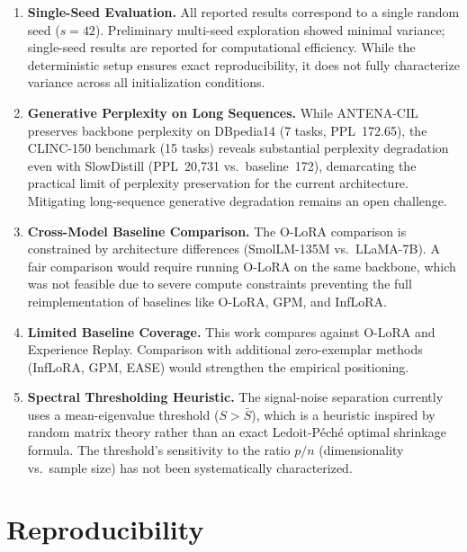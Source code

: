 \documentclass[11pt,a4paper]{article}
\begin{document}
\begin{enumerate}
    \item \textbf{Single-Seed Evaluation.} All reported results correspond to a single random seed ($s=42$). Preliminary multi-seed exploration showed minimal variance; single-seed results are reported for computational efficiency. While the deterministic setup ensures exact reproducibility, it does not fully characterize variance across all initialization conditions.
    \item \textbf{Generative Perplexity on Long Sequences.} While ANTENA-CIL preserves backbone perplexity on DBpedia14 (7 tasks, PPL~172.65), the CLINC-150 benchmark (15 tasks) reveals substantial perplexity degradation even with SlowDistill (PPL~20,731 vs.\ baseline~172), demarcating the practical limit of perplexity preservation for the current architecture. Mitigating long-sequence generative degradation remains an open challenge.
    \item \textbf{Cross-Model Baseline Comparison.} The O-LoRA comparison is constrained by architecture differences (SmolLM-135M vs.\ LLaMA-7B). A fair comparison would require running O-LoRA on the same backbone, which was not feasible due to severe compute constraints preventing the full reimplementation of baselines like O-LoRA, GPM, and InfLoRA.
    \item \textbf{Limited Baseline Coverage.} This work compares against O-LoRA and Experience Replay. Comparison with additional zero-exemplar methods (InfLoRA, GPM, EASE) would strengthen the empirical positioning.
    \item \textbf{Spectral Thresholding Heuristic.} The signal-noise separation currently uses a mean-eigenvalue threshold ($S > \bar{S}$), which is a heuristic inspired by random matrix theory rather than an exact Ledoit-Péché optimal shrinkage formula. The threshold's sensitivity to the ratio $p/n$ (dimensionality vs.\ sample size) has not been systematically characterized.
\end{enumerate}

\section{Reproducibility}
\end{document}
